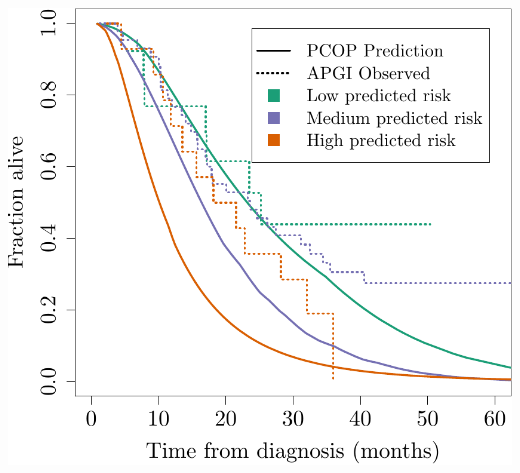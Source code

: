 \documentclass{article}\usepackage[]{graphicx}\usepackage[]{color}
\makeatletter
\def\maxwidth{ %
  \ifdim\Gin@nat@width>\linewidth
    \linewidth
  \else
    \Gin@nat@width
  \fi
}
\newenvironment{knitrout}{}{} %
\makeatother
\begin{document}
\begin{knitrout}
{\centering \includegraphics[width=\maxwidth]{figure/07-altman-4-apgi-2} 

}



\end{knitrout}
\end{document}
